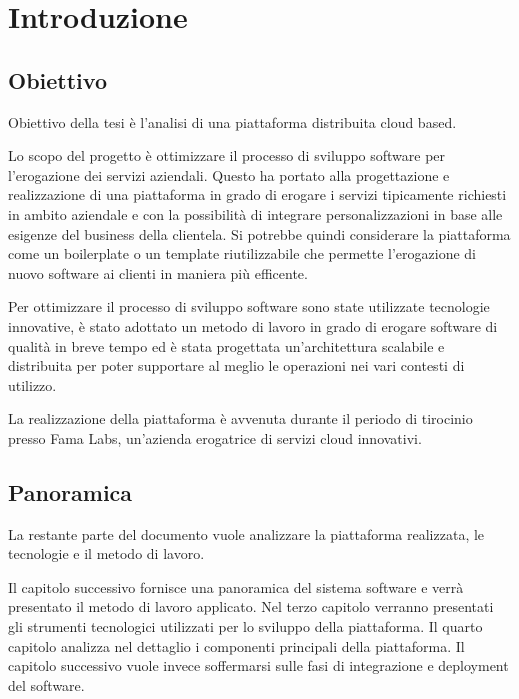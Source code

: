 \chapter{Introduzione}
\section{Obiettivo}
Obiettivo della tesi è l'analisi di una piattaforma distribuita cloud based.

Lo scopo del progetto è ottimizzare il processo di sviluppo software
per l'erogazione dei servizi aziendali.
Questo ha portato alla progettazione e realizzazione di una piattaforma in grado di erogare
i servizi tipicamente richiesti in ambito aziendale e con la possibilità di integrare
personalizzazioni in base alle esigenze del business della clientela.
Si potrebbe quindi considerare la piattaforma come un boilerplate o un template
riutilizzabile che permette l'erogazione di nuovo software ai clienti in maniera più efficente.

Per ottimizzare il processo di sviluppo software sono state utilizzate tecnologie innovative,
è stato adottato un metodo di lavoro in grado di erogare software di qualità in breve tempo ed
è stata progettata un'architettura scalabile e distribuita per poter supportare al meglio le operazioni
nei vari contesti di utilizzo.

La realizzazione della piattaforma è avvenuta durante il periodo di tirocinio presso Fama Labs,
un'azienda erogatrice di servizi cloud innovativi.


\section{Panoramica}
La restante parte del documento vuole analizzare la piattaforma realizzata, le tecnologie e il metodo di lavoro.

Il capitolo successivo fornisce una panoramica del sistema software
e verrà presentato il metodo di lavoro applicato. Nel terzo capitolo verranno presentati
gli strumenti tecnologici utilizzati per lo sviluppo della piattaforma. Il quarto capitolo
analizza nel dettaglio i componenti principali della piattaforma. Il capitolo successivo
vuole invece soffermarsi sulle fasi di integrazione e deployment del software.
